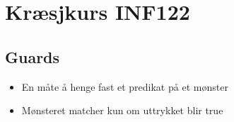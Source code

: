 \documentclass{article}
\begin{document}
    \section{Kræsjkurs INF122}

    \subsection{Guards}
    \begin{itemize}
        \item En måte å henge fast et predikat på et mønster
        \item Mønsteret matcher kun om uttrykket blir true
    \end{itemize}
\end{document}
